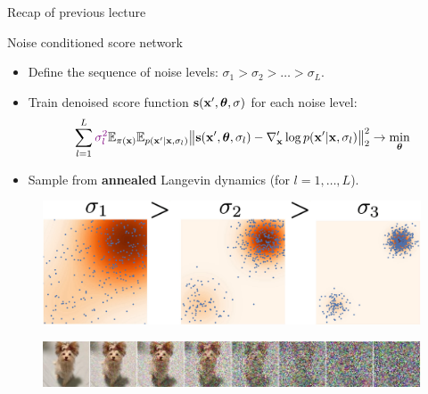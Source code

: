 \begin{frame}{Recap of previous lecture}
	\begin{block}{Noise conditioned score network}
		\begin{itemize}
			\item Define the sequence of noise levels: $\sigma_1 > \sigma_2 > \dots > \sigma_L$.
			\item Train denoised score function $\mathbf{s}(\mathbf{x}', \boldsymbol{\theta}, \sigma)$ for each noise level:
			\vspace{-0.3cm}
			\[
				\sum_{l=1}^L {\color{violet}\sigma_l^2} \mathbb{E}_{\pi(\mathbf{x})} \mathbb{E}_{p(\mathbf{x}' | \mathbf{x}, \sigma_l)}\bigl\| \mathbf{s}(\mathbf{x}', \boldsymbol{\theta}, \sigma_l) - \nabla_{\mathbf{x}}' \log p(\mathbf{x}' | \mathbf{x}, \sigma_l) \bigr\|^2_2 \rightarrow \min_{\boldsymbol{\theta}}
			\]
			\vspace{-0.5cm}
			\item Sample from \textbf{annealed} Langevin dynamics (for $l=1, \dots, L$).
		\end{itemize}
	\end{block}
	\begin{figure}
		\includegraphics[width=0.55\linewidth]{figs/multi_scale}
	\end{figure}
	\begin{figure}
		\includegraphics[width=\linewidth]{figs/duoduo}
	\end{figure}
\end{frame}

